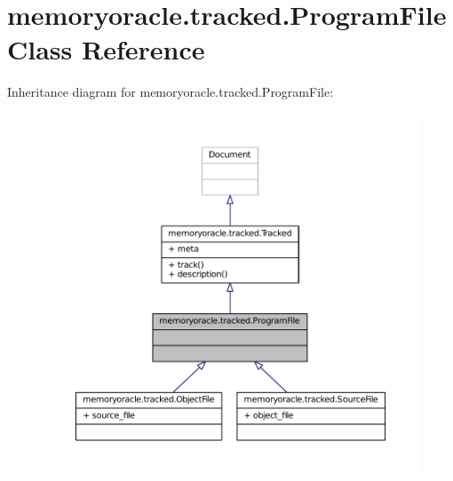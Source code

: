 \hypertarget{classmemoryoracle_1_1tracked_1_1ProgramFile}{}\section{memoryoracle.\+tracked.\+Program\+File Class Reference}
\label{classmemoryoracle_1_1tracked_1_1ProgramFile}


Inheritance diagram for memoryoracle.\+tracked.\+Program\+File\+:
\nopagebreak
\begin{figure}[H]
\begin{center}
\leavevmode
\includegraphics[width=350pt]{classmemoryoracle_1_1tracked_1_1ProgramFile__inherit__graph}
\end{center}
\end{figure}


